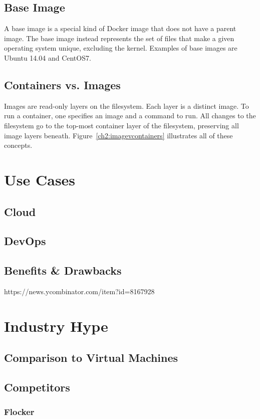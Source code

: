 \subsection{Base Image}
A base image is a special kind of Docker image that does not have a parent image. The base image instead represents the set of files that make a given operating system unique, excluding the kernel. Examples of base images are Ubuntu 14.04 and CentOS7.

\subsection{Containers vs. Images}
Images are read-only layers on the filesystem. Each layer is a distinct image. To run a container, one specifies an image and a command to run. All changes to the filesystem go to the top-most container layer of the filesystem, preserving all image layers beneath. Figure~\ref{ch2:imagevcontainers} illustrates all of these concepts.

\section{Use Cases}\label{ch2:usecase}
\subsection{Cloud}
\subsection{DevOps}

\subsection{Benefits \& Drawbacks}\label{ch2:bd}
https://news.ycombinator.com/item?id=8167928

\section{Industry Hype}\label{ch2:industry}
\subsection{Comparison to Virtual Machines}
\subsection{Competitors}
\subsubsection{Flocker}

